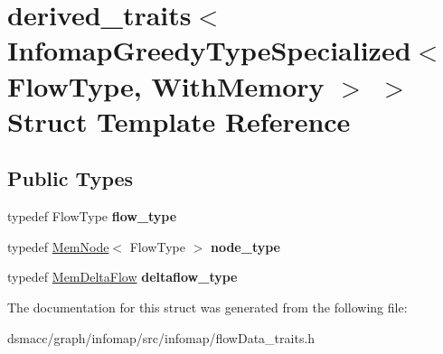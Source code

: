 \hypertarget{structderived__traits_3_01InfomapGreedyTypeSpecialized_3_01FlowType_00_01WithMemory_01_4_01_4}{}\section{derived\+\_\+traits$<$ Infomap\+Greedy\+Type\+Specialized$<$ Flow\+Type, With\+Memory $>$ $>$ Struct Template Reference}
\label{structderived__traits_3_01InfomapGreedyTypeSpecialized_3_01FlowType_00_01WithMemory_01_4_01_4}
\subsection*{Public Types}
\begin{DoxyCompactItemize}
\item 
\mbox{\label{structderived__traits_3_01InfomapGreedyTypeSpecialized_3_01FlowType_00_01WithMemory_01_4_01_4_a15b8212cee9e7bacbaa4b331432305b2}} 
typedef Flow\+Type {\bfseries flow\+\_\+type}
\item 
\mbox{\label{structderived__traits_3_01InfomapGreedyTypeSpecialized_3_01FlowType_00_01WithMemory_01_4_01_4_aeb8df72071e65604a2b9842cf4784bf7}} 
typedef \mbox{\hyperlink{classMemNode}{Mem\+Node}}$<$ Flow\+Type $>$ {\bfseries node\+\_\+type}
\item 
\mbox{\label{structderived__traits_3_01InfomapGreedyTypeSpecialized_3_01FlowType_00_01WithMemory_01_4_01_4_a9c65fbc4b1fbdea6616a0f4bcb94f572}} 
typedef \mbox{\hyperlink{structMemDeltaFlow}{Mem\+Delta\+Flow}} {\bfseries deltaflow\+\_\+type}
\end{DoxyCompactItemize}


The documentation for this struct was generated from the following file\+:\begin{DoxyCompactItemize}
\item 
dsmacc/graph/infomap/src/infomap/flow\+Data\+\_\+traits.\+h\end{DoxyCompactItemize}
